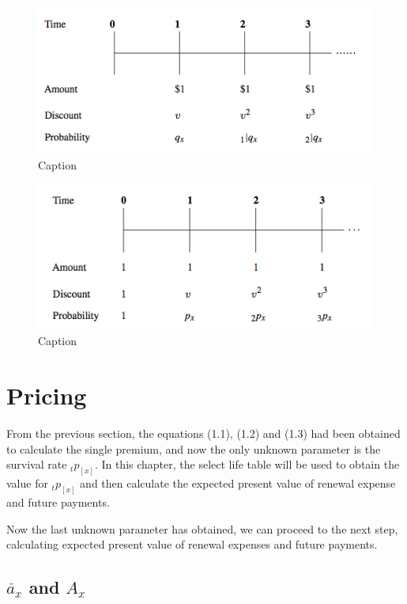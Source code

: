 \documentclass{report}
\begin{document}
\begin{figure}[htb]
    \centering
    \includegraphics{fig1.png}
    \caption{Caption}
\end{figure}

\begin{figure}[htb]
    \centering
    \includegraphics{fig2.png}
    \caption{Caption}
\end{figure}


\section{Pricing}

From the previous section, the equations (1.1), (1.2) and (1.3) had been obtained to calculate the single premium, and now the only unknown parameter is the survival rate $_tp_{[x]}$. In this chapter, the select life table will be used to obtain the value for $_tp_{[x]}$ and then calculate the expected present value of renewal expense and future payments. 



Now the last unknown parameter has obtained, we can proceed to the next step, calculating expected present value of renewal expenses and future payments.



\subsection{$\ddot{a_x}$ and $A_x$}
\end{document}
